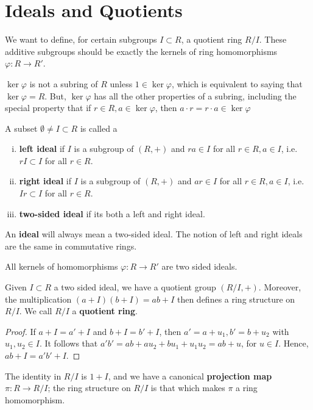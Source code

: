 \section{Ideals and Quotients}

We want to define, for certain subgroups $I\subset R$, a quotient ring $R/I$. These additive subgroups should be exactly the kernels of ring homomorphisms $\varphi:R \to R'$.

\begin{notebox*}
    $\ker \varphi$ is not a subring of $R$ unless $1 \in \ker \varphi$, which is equivalent to saying that $\ker \varphi = R$. But, $\ker \varphi$ has all the other properties of a subring, including the special property that if $r \in R,a \in \ker \varphi$, then $a\cdot r=r\cdot a \in \ker \varphi$
\end{notebox*}

\begin{defn}[Ideals]
    A subset $\emptyset \neq I \subset R$ is called a
    \begin{enumerate}[(i)]
        \item \textbf{left ideal} if $I$ is a subgroup of $(R,+)$ and $ra \in I$ for all $r \in R,a \in I$, i.e. $rI \subset I$ for all $r \in R$.
        \item \textbf{right ideal} if $I$ is a subgroup of $(R,+)$ and $ar \in I$ for all $r\in R,a \in I$, i.e. $Ir \subset I$ for all $r \in R$.
        \item \textbf{two-sided ideal} if its both a left and right ideal.
    \end{enumerate}
    An \textbf{ideal} will always mean a two-sided ideal. The notion of left and right ideals are the same in commutative rings.
\end{defn}

\begin{ex}
    All kernels of homomorphisms $\varphi :R \to R'$ are two sided ideals.
\end{ex}

\begin{defn}
    Given $I \subset R$ a two sided ideal, we have a quotient group $(R/I,+)$. Moreover, the multiplication $(a+I)(b+I)=ab+I$ then defines a ring structure on $R/I$. We call $R/I$ a \textbf{quotient ring}.
\end{defn}

\begin{proof}
    If $a+I=a'+I$ and $b+I=b'+I$, then $a'=a+u_1,b'=b+u_2$ with $u_1,u_2\in I$. It follows that $a'b' = ab+au_2+bu_1+u_1u_2=ab+u$, for $u \in I$. Hence, $ab+I = a'b'+I$.
\end{proof}
\begin{rmk}
    The identity in $R/I$ is $1+I$, and we have a canonical \textbf{projection map} $\pi:R \to R/I$; the ring structure on $R/I$ is that which makes $\pi$ a ring homomorphism.
\end{rmk}

